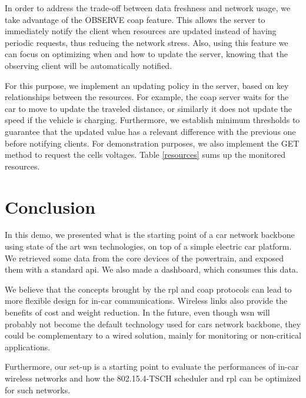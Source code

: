 \documentclass[runningheads]{llncs}
\begin{document}
In order to address the trade-off between data freshness and network usage, 
we take advantage of the OBSERVE \gls{coap} feature.
This allows the server to immediately notify the client when resources are
updated instead of having periodic requests, thus reducing the network stress.
Also, using this feature we can focus on optimizing when and how to update the
server, knowing that the observing client will be automatically notified.


For this purpose, we implement an updating policy in the server, based on key relationships between the resources.
For example, the \gls{coap} server waits for the car to move to update
the traveled distance, or similarly it does not update
the speed if the vehicle is charging.
Furthermore, we establish minimum thresholds to guarantee that the updated value
has a relevant difference with the previous one before notifying clients.
For demonstration purposes, we also implement the GET method to request the cells voltages. Table \ref{resources} sums up the monitored resources.





\section{Conclusion}

In this demo, we presented what is the starting point of a car network backbone using state of the art \gls{wsn} technologies, on top of a simple electric car platform.
We retrieved some data from the core devices of the powertrain, and exposed them with a standard \gls{api}.
We also made a dashboard, which consumes this data.

We believe that the concepts brought by the \gls{rpl} and \gls{coap} protocols can lead to more flexible design for in-car communications.
Wireless links also provide the benefits of cost and weight reduction.
In the future, even though \gls{wsn} will probably not become the default technology used for cars network backbone, they could be complementary to a wired solution, mainly for monitoring or non-critical applications.

Furthermore, our set-up is a starting point to evaluate the performances of in-car wireless networks and how the 802.15.4-TSCH scheduler and \gls{rpl} can be optimized for such networks.




\end{document}
